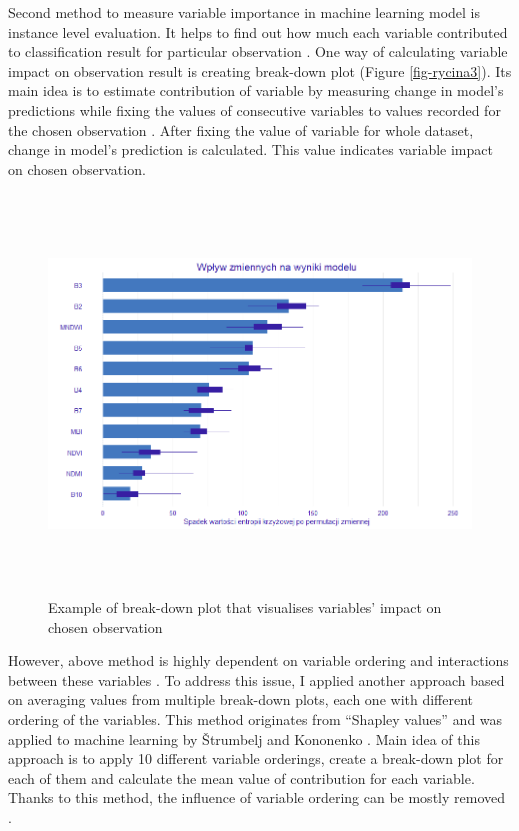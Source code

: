 \documentclass{amuthesis}
\begin{document}
Second method to measure variable importance in machine learning model
is instance level evaluation. It helps to find out how much each
variable contributed to classification result for particular observation
\autocite{biecek_explanatory_2021}. One way of calculating variable
impact on observation result is creating break-down plot (Figure
\ref{fig-rycina3}). Its main idea is to estimate contribution of
variable by measuring change in model's predictions while fixing the
values of consecutive variables to values recorded for the chosen
observation \autocite{biecek_explanatory_2021}. After fixing the value
of variable for whole dataset, change in model's prediction is
calculated. This value indicates variable impact on chosen observation.

\begin{figure}[t]

{\centering \includegraphics[width=1\textwidth,height=4.16667in]{./figures/importance.png}

}

\caption{\label{fig-rycina4}Example of break-down plot that visualises
variables' impact on chosen observation}

\end{figure}

However, above method is highly dependent on variable ordering and
interactions between these variables \autocite{biecek_explanatory_2021}.
To address this issue, I applied another approach based on averaging
values from multiple break-down plots, each one with different ordering
of the variables. This method originates from ``Shapley values''
\autocite{shapley_value_1953} and was applied to machine learning by
Štrumbelj and Kononenko \autocite*{strumbelj_efficient_2010}. Main idea
of this approach is to apply 10 different variable orderings, create a
break-down plot for each of them and calculate the mean value of
contribution for each variable. Thanks to this method, the influence of
variable ordering can be mostly removed
\autocite{biecek_explanatory_2021}.
\end{document}
